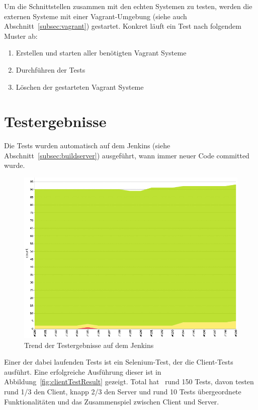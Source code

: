 \begin{description}
					Um die Schnittstellen zusammen mit den echten Systemen zu testen,
					werden die externen Systeme mit einer Vagrant-Umgebung (siehe auch Abschnitt~\ref{subsec:vagrant}) gestartet.
					Konkret läuft ein Test nach folgendem Muster ab:
					\begin{enumerate}
						\item Erstellen und starten aller benötigten Vagrant Systeme
						\item Durchführen der Tests
						\item Löschen der gestarteten Vagrant Systeme
					\end{enumerate}


			\end{description}
		
		\section{Testergebnisse}
			Die Tests wurden automatisch auf dem Jenkins (siehe Abschnitt~\ref{subsec:buildserver}) ausgeführt,
			wann immer neuer Code committed wurde.

			\begin{figure}[H]
				\includegraphics[width=\linewidth]{projectPlan/media/img/jenkinsTrend.png}
				\centering
				\caption{Trend der Testergebnisse auf dem Jenkins}
				\label{fig:jenkinsTrend}
			\end{figure}
			
			Einer der dabei laufenden Tests ist ein Selenium-Test, der die Client-Tests ausführt.
			Eine erfolgreiche Ausführung dieser ist in Abbildung~\ref{fig:clientTestResult} gezeigt.
			Total hat \eeppi\ rund 150 Tests, davon testen rund 1/3 den Client, knapp 2/3 den Server
			und rund 10 Tests übergeordnete Funktionalitäten und das Zusammenspiel zwischen Client und Server.
			
